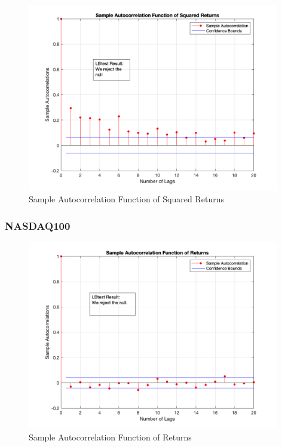 \documentclass{report}
\begin{document}
\begin{figure}[H]
	\centering
	\includegraphics[width = 11cm]{fig/1c22}
	\caption{Sample Autocorrelation Function of Squared Returns} 
\end{figure}




\subsubsection*{NASDAQ100}

\begin{figure}[H]
	\centering
	\includegraphics[width = 11cm]{fig/1c31}
	\caption{Sample Autocorrelation Function of Returns} 
\end{figure}
\end{document}
